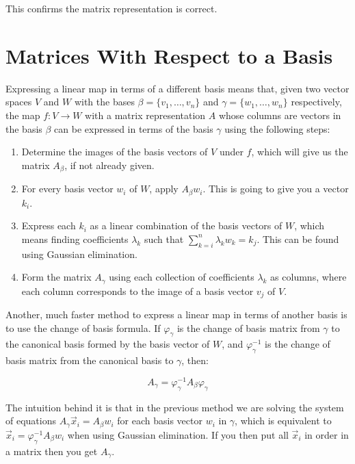 This confirms the matrix representation is correct.

\section{Matrices With Respect to a Basis}

Expressing a linear map in terms of a different basis means that, given two vector spaces \(V\) and \(W\)
with the bases \(\beta = \{v_1, \dots, v_n\}\) and \(\gamma = \{w_1, \dots, w_n\}\) respectively,
the map \(f: V \to W\) with a matrix representation \(A\) whose columns are
vectors in the basis \(\beta\) can be expressed in terms of the basis \(\gamma\) using the following steps:

\begin{enumerate}

    \item Determine the images of the basis vectors of \(V\) under \(f\), which will give us the matrix \(A_\beta\), if not already given.

    \item For every basis vector \(w_i\) of \(W\), apply \(A_\beta w_i\). This is going to give you a vector \(k_i\).

    \item Express each \(k_i\) as a linear combination of the basis vectors of \(W\), which means finding coefficients \(\lambda_k\) such that
          \(\sum_{k = i}^{n} \lambda_k w_k = k_j\). This can be found using Gaussian elimination.

    \item Form the matrix \(A_{\gamma}\) using each collection of coefficients \(\lambda_k\) as columns, where each column corresponds to the image of a
          basis vector \(v_j\) of \(V\).

\end{enumerate}

Another, much faster method to express a linear map in terms of another basis is to use the change of basis formula.
If \(\varphi_\gamma\) is the change of basis matrix from \(\gamma\) to the canonical basis formed by the basis vector of \(W\),
and \(\varphi_{\gamma}^{-1}\) is the change of basis matrix from the canonical basis to \(\gamma\), then:

\[
    A_{\gamma} = \varphi_\gamma^{-1} A_\beta \varphi_\gamma
\]

The intuition behind it is that in the previous method we are solving the system of equations \(A_{\gamma}\vec{x}_i = A_\beta w_i\) for
each basis vector \(w_i\) in \(\gamma\), which is equivalent to \(\vec{x}_i = \varphi_{\gamma}^{-1} A_\beta w_i\) when using
Gaussian elimination. If you then put all \(\vec{x}_i\) in order in a matrix then you get \(A_{\gamma}\).

